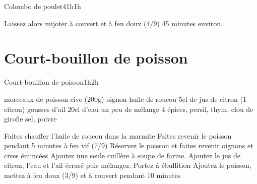 {\begin{recette}{Colombo de poulet}{4}{1h}{1h}
\begin{cuisson}
Laissez alors mijoter à couvert et à feu doux (4/9) 45 minutes environ.
\end{cuisson}
\end{recette}

\section{Court-bouillon de poisson}
\begin{recette}{Court-bouillon de poisson}{}{1h}{2h}
\begin{ingredients}
\ingredient morceaux de poisson
 cive (200g)
 oignon
\ingredient huile de roucou
\ingredient 5cl de jus de citron (1 citron)
 gousses d'ail
\ingredient 20cl d'eau
\ingredient un peu de mélange 4 épices, persil, thym, clou de girofle
\ingredient sel, poivre
\end{ingredients}

\begin{preparation}
\etape Faites chauffer l'huile de roucou dans la marmite
\etape Faites revenir le poisson pendant 5 minutes à feu vif (7/9)
\etape Réservez le poisson et faites revenir oignons et cives émincées
\etape Ajoutez une seule cuillère à soupe de farine. Ajoutez le jus de citron, l'eau et l'ail écrasé puis mélangez. 
\etape Portez à ébullition
\etape Ajoutez le poisson, mettez à feu doux (3/9) et à couvert pendant 10 minutes
\end{preparation}
\end{recette}

}
